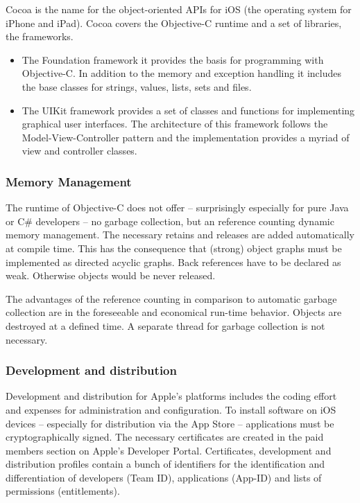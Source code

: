 Cocoa is the name for the object-oriented APIs for iOS (the operating system for iPhone and iPad). 
Cocoa covers the Objective-C runtime and a set of libraries, the frameworks.
\begin{itemize}
\item The Foundation framework it provides the basis for programming with Objective-C. 
In addition to the memory and exception handling it includes the base classes for strings, values, lists, sets and files.
\item The UIKit framework provides a set of classes and functions for implementing graphical user interfaces. 
The architecture of this framework follows the Model-View-Controller pattern 
and the implementation provides a myriad of view and controller classes.
\end{itemize}

\subsubsection{Memory Management}
\label{sec:MemoryManagement}
The runtime of Objective-C does not offer – surprisingly especially for pure Java or C\# developers  – no garbage collection, 
but an reference counting dynamic memory management. The necessary retains and releases are added automatically at compile time.
This has the consequence that (strong) object graphs must be implemented as directed acyclic graphs. Back references have to be declared as weak.
Otherwise objects would be never released. 

The advantages of the reference counting in comparison to automatic garbage collection are in the foreseeable and economical run-time behavior.
Objects are destroyed at a defined time. A separate thread for garbage collection is not necessary. 


\subsubsection{Development and distribution}
\label{sec:DAD}
Development and distribution for Apple's platforms includes the coding effort and expenses for administration and configuration. 
To install software on iOS devices – especially for distribution via the App Store – applications must be cryptographically signed. 
The necessary certificates are created in the paid members section on Apple's Developer Portal. 
Certificates, development and distribution profiles contain a bunch of identifiers for the identification and differentiation of developers (Team ID), 
applications (App-ID) and lists of permissions (entitlements). 

